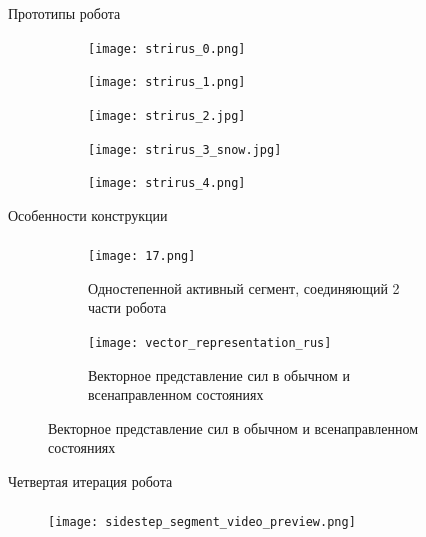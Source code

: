 \begin{frame}[c]{Прототипы робота}
    \begin{figure}[H]
        \begin{subfigure}{0.32\textwidth}
            \centering\texttt{[image: strirus\_0.png]}
        \end{subfigure}
        \begin{subfigure}{0.32\textwidth}
            \centering\texttt{[image: strirus\_1.png]}
        \end{subfigure}
        \begin{subfigure}{0.32\textwidth}
            \centering\texttt{[image: strirus\_2.jpg]}
        \end{subfigure}

        \begin{subfigure}{0.32\textwidth}
            \centering\texttt{[image: strirus\_3\_snow.jpg]}
        \end{subfigure}
        \begin{subfigure}{0.32\textwidth}
            \centering\texttt{[image: strirus\_4.png]}
        \end{subfigure}
    \end{figure}
\end{frame}

\begin{frame}[c]{Особенности конструкции}
    \framesubtitle{}
    \begin{figure}[H]
        \begin{subfigure}{0.39\textwidth}
            \centering\texttt{[image: 17.png]}
            \caption{Одностепенной активный сегмент, соединяющий 2 части робота}
        \end{subfigure}
        \begin{subfigure}{0.59\textwidth}
            \centering\texttt{[image: vector\_representation\_rus]}
            \caption{Векторное представление сил в обычном и всенаправленном состояниях}
        \end{subfigure}
    \end{figure}
\end{frame}

\begin{frame}[t]{Четвертая итерация робота}
    \framesubtitle{}
    \begin{figure}[H]
        \centering\texttt{[image: sidestep\_segment\_video\_preview.png]}
    \end{figure}
\end{frame}